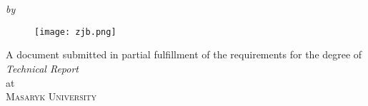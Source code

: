 \begin{titlepage}
  \vspace*{5cm}
  \makeatletter
  \begin{center}
    \begin{Huge}
      \@title
    \end{Huge}\\[0.1cm]
    \begin{Large}
      \@subtitle
    \end{Large}\\
    \emph{by}\\
    \@author
    \begin{figure}[h]
      \centering
      \texttt{[image: zjb.png]}
    \end{figure}

    \vfill
    A document submitted in partial fulfillment
    of the requirements for the degree of\\
    \emph{Technical Report}\\
    at\\
    \textsc{Masaryk University}
  \end{center}
  \makeatother
\end{titlepage}

\newpage
\null
\thispagestyle{empty}
\newpage
